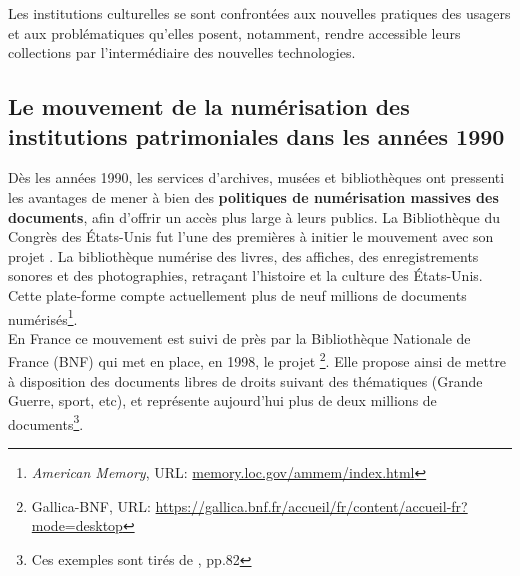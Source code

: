 Les institutions culturelles se sont confrontées aux nouvelles pratiques des usagers et aux problématiques qu'elles posent, notamment, rendre accessible leurs collections par l'intermédiaire des nouvelles technologies. 

\subsection{Le mouvement de la numérisation des institutions patrimoniales dans les années 1990} 

Dès les années 1990, les services d'archives, musées et bibliothèques ont pressenti les avantages de mener à bien des \textbf{politiques de numérisation massives des documents}, afin d'offrir un accès plus large à leurs publics. La Bibliothèque du Congrès des États-Unis fut l'une des premières à initier le mouvement avec son projet . La bibliothèque numérise des livres, des affiches, des enregistrements sonores et des photographies, retraçant l'histoire et la culture des États-Unis. Cette plate-forme compte actuellement plus de neuf millions de documents numérisés\footnote{\textit{American Memory}, URL: \url{memory.loc.gov/ammem/index.html}}.\\ 

En France ce mouvement est suivi de près par la Bibliothèque Nationale de France (BNF) qui met en place, en 1998, le projet \footnote{Gallica-BNF, URL: \url{https://gallica.bnf.fr/accueil/fr/content/accueil-fr?mode=desktop}}. Elle propose ainsi de mettre à disposition des documents libres de droits suivant des thématiques (Grande Guerre, sport, etc), et représente aujourd'hui plus de deux millions de documents\footnote{Ces exemples sont tirés de \cite{gillet_introduction_2016}, pp.82}.\\

